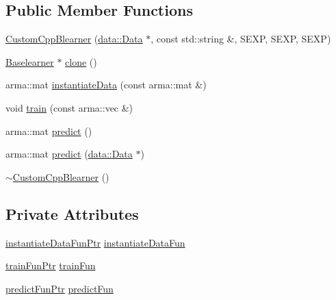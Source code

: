 \subsection*{Public Member Functions}
\begin{DoxyCompactItemize}
\item 
\mbox{\hyperlink{classblearner_1_1_custom_cpp_blearner_a053eccfff8223ab0358b7f00ed02d263}{Custom\+Cpp\+Blearner}} (\mbox{\hyperlink{classdata_1_1_data}{data\+::\+Data}} $\ast$, const std\+::string \&, S\+E\+XP, S\+E\+XP, S\+E\+XP)
\item 
\mbox{\hyperlink{classblearner_1_1_baselearner}{Baselearner}} $\ast$ \mbox{\hyperlink{classblearner_1_1_custom_cpp_blearner_a8b76705131d397974cd208fdcfd70496}{clone}} ()
\item 
arma\+::mat \mbox{\hyperlink{classblearner_1_1_custom_cpp_blearner_a14607a1d1f312d46a3024b37085c146d}{instantiate\+Data}} (const arma\+::mat \&)
\item 
void \mbox{\hyperlink{classblearner_1_1_custom_cpp_blearner_aa71b777d7092a3d9b47a9bed125eb0f9}{train}} (const arma\+::vec \&)
\item 
arma\+::mat \mbox{\hyperlink{classblearner_1_1_custom_cpp_blearner_aa17db5f5627b8251b2d8484d92e783b9}{predict}} ()
\item 
arma\+::mat \mbox{\hyperlink{classblearner_1_1_custom_cpp_blearner_af2326171640e94c3a00f813781710208}{predict}} (\mbox{\hyperlink{classdata_1_1_data}{data\+::\+Data}} $\ast$)
\item 
\mbox{\hyperlink{classblearner_1_1_custom_cpp_blearner_a4e26b5c9da2eaff19a21de8fdb534bc5}{$\sim$\+Custom\+Cpp\+Blearner}} ()
\end{DoxyCompactItemize}
\subsection*{Private Attributes}
\begin{DoxyCompactItemize}
\item 
\mbox{\hyperlink{namespaceblearner_a10cec16134a934fb9defbdc2c2011f2a}{instantiate\+Data\+Fun\+Ptr}} \mbox{\hyperlink{classblearner_1_1_custom_cpp_blearner_a51d1b6de280bcfa542b1e0cf87ee5bce}{instantiate\+Data\+Fun}}
\item 
\mbox{\hyperlink{namespaceblearner_a5e2b38edf05e32681bee136af9ae505d}{train\+Fun\+Ptr}} \mbox{\hyperlink{classblearner_1_1_custom_cpp_blearner_ac4dd33045cf6c5d0272414325933da9c}{train\+Fun}}
\item 
\mbox{\hyperlink{namespaceblearner_a93d5b51440d434704d2bde9dee652f6e}{predict\+Fun\+Ptr}} \mbox{\hyperlink{classblearner_1_1_custom_cpp_blearner_a3de859c383be2320f1c2a9b4954a91b0}{predict\+Fun}}
\end{DoxyCompactItemize}
